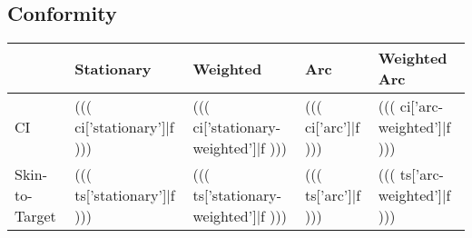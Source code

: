 \documentclass[12pt]{article}
\begin{document}
\subsection{Conformity}
\begin{table}[H]
\begin{tabular}{l l l l l}
	& Stationary & Weighted & Arc & Weighted Arc \\
	\hline
	CI & ((( ci['stationary']|f ))) & ((( ci['stationary-weighted']|f ))) & ((( ci['arc']|f ))) & ((( ci['arc-weighted']|f ))) \\
	Skin-to-Target & ((( ts['stationary']|f ))) & ((( ts['stationary-weighted']|f ))) & ((( ts['arc']|f ))) & ((( ts['arc-weighted']|f )))
\end{tabular}
\end{table}
\end{document}
